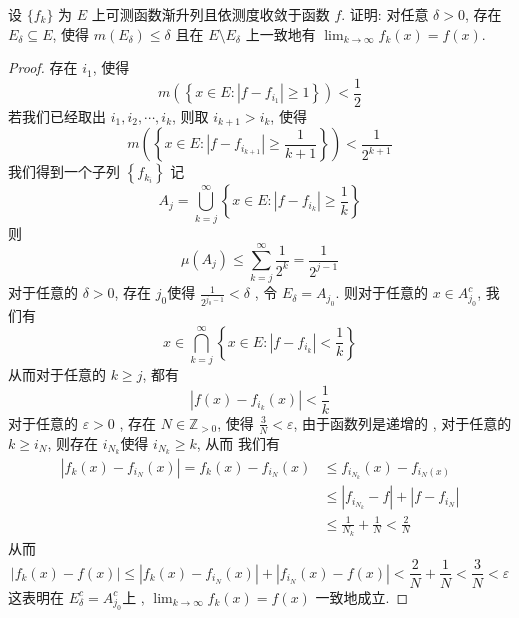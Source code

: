 \documentclass[../main.tex]{subfiles}
\begin{document}
\begin{exercise}{}{}
设 $\{f_k\}$ 为 $E$ 上可测函数渐升列且依测度收敛于函数 $f$. 证明: 对任意 $\delta > 0$, 存在 $E_\delta \subseteq E$, 使得 $m(E_\delta) \le \delta$ 且在 $E \setminus E_\delta$ 上一致地有 $\lim_{k\to\infty} f_k(x) = f(x)$.
\end{exercise}
\begin{proof}
    存在 \(  i_1  \), 使得 \[
    m\left( \left\{ x\in E: \left| f-f_{i_1} \right|\ge 1 \right\} \right) < \frac{1 }{2 } 
    \]  若我们已经取出 \(  i_1,i_2,\cdots ,i_{k}  \), 则取 \(  i_{k+ 1}> i_{k}  \), 使得 \[
    m\left( \left\{ x \in E: \left| f-f_{i_{k+ 1}} \right|\ge \frac{1 }{k+ 1 }   \right\} \right)< \frac{1 }{2^{k+ 1} }  
    \]  我们得到一个子列 \(  \left\{ f_{k_{i}} \right\}  \) 
    记 \[
    A_{j}= \bigcup _{k= j}^{\infty} \left\{ x\in E: \left| f-f_{i_{k}} \right|\ge \frac{1 }{k }   \right\}
    \]则 \[
    \mu \left( A_{j} \right)\le \sum _{ k= j}^{\infty}\frac{1 }{2^{k} }=  \frac{1 }{2^{j-1} }   
    \]对于任意的 \(   \delta > 0  \), 存在 \(  j_0  \)使得 \(  \frac{1 }{2^{j_0-1} }<  \delta    \)  , 令 \(  E_{ \delta }= A_{j_0}  \). 则对于任意的 \(  x \in A_{j_0}^{c}  \), 我们有 \[
    x \in \bigcap _{k= j}^{\infty}\left\{ x\in E: \left| f-f_{i_{k}} \right|< \frac{1 }{k }   \right\}
    \]   从而对于任意的 \(  k\ge j  \), 都有 \[
    \left| f\left( x \right)-f_{i_{k}}\left( x \right)   \right|< \frac{1 }{k }  
    \] 对于任意的 \(   \varepsilon > 0  \) , 存在 \(  N \in \mathbb{Z} _{> 0} \), 使得 \(  \frac{3 }{N }<  \varepsilon    \), 由于函数列是递增的 , 对于任意的 \(  k \ge i_{N}  \), 则存在 \(  i_{N_{k}}  \)使得 \(  i_{N_{k}}\ge k  \), 从而   我们有   \[
    \begin{aligned}
    \left| f_{k}\left( x \right)-f_{i_{N}}\left( x \right)   \right|= f_{k}\left( x \right)-f_{i_{N}}\left( x \right)&\le f_{i_{N _{k}}}\left( x \right)-f_{i_{N}\left( x \right) }  \\ 
     &\le \left| f_{i_{N_{k}}} -f\right|+ \left| f-f_{i_{N}} \right|\\ 
      &\le \frac{1 }{N_{k} }+ \frac{1 }{N }< \frac{2 }{N }     
    \end{aligned}
    \]从而\[
    \left| f_{k}\left( x \right)-f\left( x \right)   \right|\le \left| f_{k}\left( x \right)-f_{i_{N}}\left( x \right)   \right|+ \left| f_{i_{N}}\left( x \right)-f\left( x \right)   \right|   < \frac{2 }{N }+ \frac{1 }{N }< \frac{3 }{N }<  \varepsilon    
    \]这表明在 \(E_{ \delta }^{c}=   A_{j_0}^{c}  \)上 , \(  \lim_{k\to \infty}f_{k}\left( x \right)= f\left( x \right)    \) 一致地成立.
\end{proof}
\end{document}
